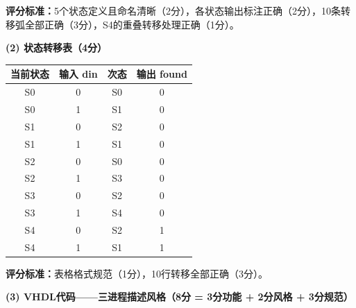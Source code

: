 \textbf{评分标准：}5个状态定义且命名清晰（2分），各状态输出标注正确（2分），10条转移弧全部正确（3分），S4的重叠转移处理正确（1分）。

\vspace{0.3cm}

\textbf{(2) 状态转移表（4分）}

\begin{center}
\begin{tabular}{|c|c|c|c|}
\hline
\textbf{当前状态} & \textbf{输入 din} & \textbf{次态} & \textbf{输出 found} \\
\hline
S0 & 0 & S0 & 0 \\
S0 & 1 & S1 & 0 \\
\hline
S1 & 0 & S2 & 0 \\
S1 & 1 & S1 & 0 \\
\hline
S2 & 0 & S0 & 0 \\
S2 & 1 & S3 & 0 \\
\hline
S3 & 0 & S2 & 0 \\
S3 & 1 & S4 & 0 \\
\hline
S4 & 0 & S2 & 1 \\
S4 & 1 & S1 & 1 \\
\hline
\end{tabular}
\end{center}

\textbf{评分标准：}表格格式规范（1分），10行转移全部正确（3分）。

\vspace{0.3cm}

\textbf{(3) VHDL代码——三进程描述风格（8分 = 3分功能 + 2分风格 + 3分规范）}

